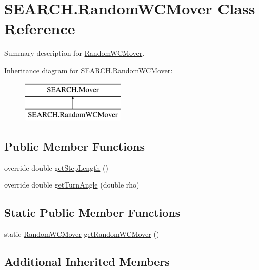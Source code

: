 \hypertarget{class_s_e_a_r_c_h_1_1_random_w_c_mover}{\section{S\-E\-A\-R\-C\-H.\-Random\-W\-C\-Mover Class Reference}
\label{class_s_e_a_r_c_h_1_1_random_w_c_mover}
}


Summary description for \hyperlink{class_s_e_a_r_c_h_1_1_random_w_c_mover}{Random\-W\-C\-Mover}.  


Inheritance diagram for S\-E\-A\-R\-C\-H.\-Random\-W\-C\-Mover\-:\begin{figure}[H]
\begin{center}
\leavevmode
\includegraphics[height=2.000000cm]{class_s_e_a_r_c_h_1_1_random_w_c_mover}
\end{center}
\end{figure}
\subsection*{Public Member Functions}
\begin{DoxyCompactItemize}
\item 
override double \hyperlink{class_s_e_a_r_c_h_1_1_random_w_c_mover_a50f9ef5586b7740beeeb197b7334a560}{get\-Step\-Length} ()
\item 
override double \hyperlink{class_s_e_a_r_c_h_1_1_random_w_c_mover_af859a09b56a19e9e8a772bebbf802142}{get\-Turn\-Angle} (double rho)
\end{DoxyCompactItemize}
\subsection*{Static Public Member Functions}
\begin{DoxyCompactItemize}
\item 
static \hyperlink{class_s_e_a_r_c_h_1_1_random_w_c_mover}{Random\-W\-C\-Mover} \hyperlink{class_s_e_a_r_c_h_1_1_random_w_c_mover_a532c1ff7efb948e0e6e5eeec18263d87}{get\-Random\-W\-C\-Mover} ()
\end{DoxyCompactItemize}
\subsection*{Additional Inherited Members}


